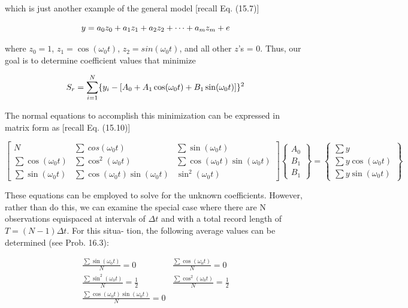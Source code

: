\documentclass[../main.tex]{subfiles}
\begin{document}
\noindent which is just another example of the general model [recall Eq. (15.7)]

\begin{equation}
	\notag
	y = a_0 z_0 + a_1 z_1 + a_2 z_2 + \cdots + a_m z_m + e
\end{equation}

\noindent where $z_0 = 1$, $z_1 = \cos(\omega_0 t)$, $z_2 = sin(\omega_0 t)$, and all other $z$'s = 0. Thus, our goal is to determine coefficient values that minimize

\begin{equation}
	\notag
	S_r = \sum ^ N _ {i=1} \{ y_i - [A_0 + A_1 \cos(\omega_0 t) + B_1 \sin(\omega_0 t)]\}^2
\end{equation}

\noindent The normal equations to accomplish this minimization can be expressed in matrix form as [recall Eq. (15.10)]

\begin{equation}
	\tag{16.12}
	\begin{bmatrix}
		N & \sum \ cos(\omega_0 t) & \sum \sin(\omega_0 t) \\
		\sum \cos(\omega_0 t) & \sum \cos^2 (\omega_0 t) & \sum \cos (\omega_0 t) \sin (\omega_0 t) \\
		\sum \sin(\omega_0 t) & \sum \cos (\omega_0 t) \sin (\omega_0 t) & \sin^2 (\omega_0 t)
	\end{bmatrix}
	\begin{Bmatrix}
		A_0 \\ B_1 \\ B_1
	\end{Bmatrix}
	=
	\begin{Bmatrix}
		\sum y \\ \sum y \cos(\omega_0 t) \\ \sum y \sin(\omega_0 t)
	\end{Bmatrix}
\end{equation}

These equations can be employed to solve for the unknown coefficients. However,
rather than do this, we can examine the special case where there are N observations equispaced at intervals of $\Delta t$ and with a total record length of $T = (N - 1)\Delta t$. For this situa-
tion, the following average values can be determined (see Prob. 16.3):

\begin{equation}
	\tag{16.13}
	\begin{matrix}
		\frac{\sum \sin (\omega_0 t)}{N} = 0 & \frac{\sum \cos (\omega_0 t)}{N} = 0 \\
		\frac{\sum \sin ^2 (\omega_0 t)}{N} = \frac{1}{2} & \frac{\sum \cos ^2 (\omega_0 t)}{N} = \frac{1}{2} \\
		\frac{\sum \cos (\omega_0 t) \sin(\omega_0 t)}{N} = 0
	\end{matrix}
\end{equation}
\end{document}
